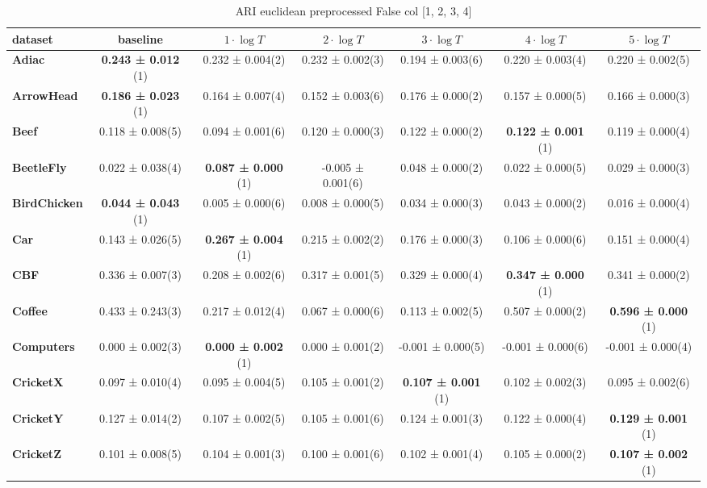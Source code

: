 \begin{table}[ht]
\caption{ARI euclidean preprocessed False col [1, 2, 3, 4]} 
\begin{adjustbox}{width=\textwidth}
\begin{tabular}{lcccccc}
\hline
dataset & baseline & \textbf{$1\cdot \log{T}$} & \textbf{$2\cdot \log{T}$} & \textbf{$3\cdot \log{T}$} & \textbf{$4\cdot \log{T}$} & \textbf{$5\cdot \log{T}$} \\ \hline
\textbf{Adiac} & \textbf{0.243 ± 0.012} (1) & 0.232 ± 0.004(2) & 0.232 ± 0.002(3) & 0.194 ± 0.003(6) & 0.220 ± 0.003(4) & 0.220 ± 0.002(5) \\
\textbf{ArrowHead} & \textbf{0.186 ± 0.023} (1) & 0.164 ± 0.007(4) & 0.152 ± 0.003(6) & 0.176 ± 0.000(2) & 0.157 ± 0.000(5) & 0.166 ± 0.000(3) \\
\textbf{Beef} & 0.118 ± 0.008(5) & 0.094 ± 0.001(6) & 0.120 ± 0.000(3) & 0.122 ± 0.000(2) & \textbf{0.122 ± 0.001} (1) & 0.119 ± 0.000(4) \\
\textbf{BeetleFly} & 0.022 ± 0.038(4) & \textbf{0.087 ± 0.000} (1) & -0.005 ± 0.001(6) & 0.048 ± 0.000(2) & 0.022 ± 0.000(5) & 0.029 ± 0.000(3) \\
\textbf{BirdChicken} & \textbf{0.044 ± 0.043} (1) & 0.005 ± 0.000(6) & 0.008 ± 0.000(5) & 0.034 ± 0.000(3) & 0.043 ± 0.000(2) & 0.016 ± 0.000(4) \\
\textbf{Car} & 0.143 ± 0.026(5) & \textbf{0.267 ± 0.004} (1) & 0.215 ± 0.002(2) & 0.176 ± 0.000(3) & 0.106 ± 0.000(6) & 0.151 ± 0.000(4) \\
\textbf{CBF} & 0.336 ± 0.007(3) & 0.208 ± 0.002(6) & 0.317 ± 0.001(5) & 0.329 ± 0.000(4) & \textbf{0.347 ± 0.000} (1) & 0.341 ± 0.000(2) \\
\textbf{Coffee} & 0.433 ± 0.243(3) & 0.217 ± 0.012(4) & 0.067 ± 0.000(6) & 0.113 ± 0.002(5) & 0.507 ± 0.000(2) & \textbf{0.596 ± 0.000} (1) \\
\textbf{Computers} & 0.000 ± 0.002(3) & \textbf{0.000 ± 0.002} (1) & 0.000 ± 0.001(2) & -0.001 ± 0.000(5) & -0.001 ± 0.000(6) & -0.001 ± 0.000(4) \\
\textbf{CricketX} & 0.097 ± 0.010(4) & 0.095 ± 0.004(5) & 0.105 ± 0.001(2) & \textbf{0.107 ± 0.001} (1) & 0.102 ± 0.002(3) & 0.095 ± 0.002(6) \\
\textbf{CricketY} & 0.127 ± 0.014(2) & 0.107 ± 0.002(5) & 0.105 ± 0.001(6) & 0.124 ± 0.001(3) & 0.122 ± 0.000(4) & \textbf{0.129 ± 0.001} (1) \\
\textbf{CricketZ} & 0.101 ± 0.008(5) & 0.104 ± 0.001(3) & 0.100 ± 0.001(6) & 0.102 ± 0.001(4) & 0.105 ± 0.000(2) & \textbf{0.107 ± 0.002} (1) \\

\end{tabular}
\end{adjustbox}
\end{table}
